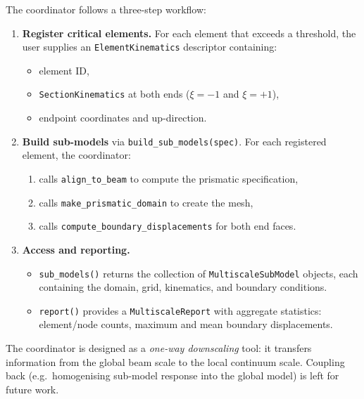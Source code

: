 The coordinator follows a three-step workflow:

\begin{enumerate}
  \item \textbf{Register critical elements.}  For each element that
    exceeds a threshold, the user supplies an
    \texttt{ElementKinematics} descriptor containing:
    \begin{itemize}
      \item element ID,
      \item \texttt{SectionKinematics} at both ends ($\xi = -1$ and
            $\xi = +1$),
      \item endpoint coordinates and up-direction.
    \end{itemize}

  \item \textbf{Build sub-models} via
    \texttt{build\_sub\_models(spec)}.  For each registered element,
    the coordinator:
    \begin{enumerate}
      \item calls \texttt{align\_to\_beam} to compute the prismatic
            specification,
      \item calls \texttt{make\_prismatic\_domain} to create the mesh,
      \item calls \texttt{compute\_boundary\_displacements} for both
            end faces.
    \end{enumerate}

  \item \textbf{Access and reporting.}
    \begin{itemize}
      \item \texttt{sub\_models()} returns the collection of
            \texttt{MultiscaleSubModel} objects, each containing the
            domain, grid, kinematics, and boundary conditions.
      \item \texttt{report()} provides a \texttt{MultiscaleReport}
            with aggregate statistics: element/node counts,
            maximum and mean boundary displacements.
    \end{itemize}
\end{enumerate}

\noindent
The coordinator is designed as a \emph{one-way downscaling} tool: it
transfers information from the global beam scale to the local continuum
scale.  Coupling back (e.g.\ homogenising sub-model response into the
global model) is left for future work.

